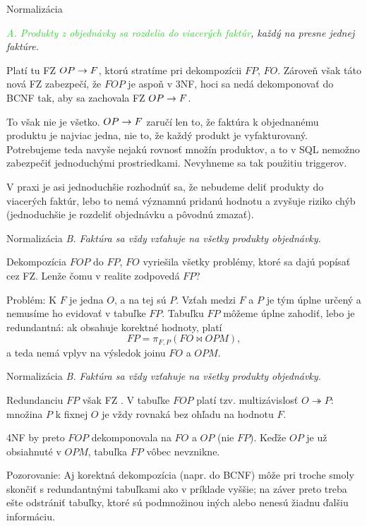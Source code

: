 \documentclass[12pt]{beamer}
\def\blue#1{\textcolor{Cerulean}{#1}}
\def\green#1{\textcolor{LimeGreen}{#1}}
\DeclareMathOperator{\join}{\bowtie}
\begin{document}
\begin{frame}[fragile]{Normalizácia}
\begin{small}
\emph{\green{A. Produkty z objednávky sa rozdelia do viacerých faktúr}, každý na presne jednej faktúre.}
\bigskip

Platí tu FZ $OP\rightarrow F$, ktorú stratíme pri dekompozícii $FP$, $FO$.
Zároveň však táto nová FZ zabezpečí, že $FOP$ je aspoň v 3NF, hoci sa nedá dekomponovať do BCNF tak, aby sa zachovala FZ $OP\rightarrow F$.
\bigskip

To však nie je všetko. $OP\rightarrow F$ zaručí len to, že faktúra k objednanému produktu je najviac jedna,
nie to, že každý produkt je vyfakturovaný. Potrebujeme teda navyše nejakú rovnosť množín produktov,
a to v SQL nemožno zabezpečiť jednoduchými prostriedkami.
Nevyhneme sa tak použitiu triggerov.
\end{small}
\bigskip

{\scriptsize V praxi je asi jednoduchšie rozhodnúť sa, že nebudeme deliť produkty do viacerých faktúr,
lebo to nemá významnú pridanú hodnotu a zvyšuje riziko chýb (jednoduchšie je rozdeliť objednávku a pôvodnú zmazať).}
\end{frame}

\begin{frame}[fragile]{Normalizácia}
\emph{\blue{B. Faktúra sa vždy vzťahuje na všetky produkty objednávky.}}
\bigskip

Dekompozícia $FOP$ do $FP$, $FO$ vyriešila všetky problémy, ktoré sa dajú popísať cez FZ.
Lenže čomu v realite zodpovedá \alert{$FP$}?
\bigskip

Problém: K $F$ je jedna $O$, a na tej sú $P$. Vzťah medzi $F$ a $P$ je tým úplne určený a nemusíme ho evidovať v tabuľke $FP$.
Tabuľku $FP$ môžeme úplne zahodiť, lebo je redundantná: ak obsahuje korektné hodnoty, platí
$$FP = \pi_{F,P}(FO \join OPM),$$
a teda nemá vplyv na výsledok joinu $FO$ a $OPM$.
\end{frame}

\begin{frame}[fragile]{Normalizácia}
\emph{\blue{B. Faktúra sa vždy vzťahuje na všetky produkty objednávky.}}
\bigskip

Redundanciu $FP$ však FZ . V tabuľke $FOP$ platí tzv. multizávislosť $O \twoheadrightarrow P$: množina $P$ k fixnej $O$ je vždy rovnaká bez ohľadu na hodnotu $F$.
\bigskip

4NF by preto $FOP$ dekomponovala na $FO$ a $OP$ (nie $FP$). Keďže $OP$ je už obsiahnuté v $OPM$, tabuľka $FP$ vôbec nevznikne.
\bigskip

{\small Pozorovanie: Aj korektná dekompozícia (napr. do BCNF) môže pri troche smoly skončiť s redundantnými tabuľkami ako v príklade vyššie; na záver preto treba ešte odstrániť tabuľky, ktoré sú podmnožinou iných alebo nenesú žiadnu ďalšiu informáciu.}
\end{frame}
\end{document}
